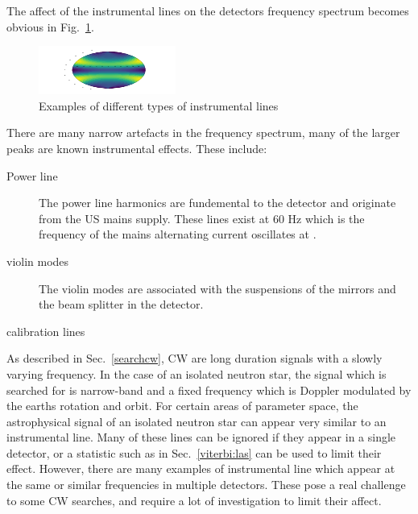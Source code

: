 The affect of the instrumental lines on the detectors frequency spectrum becomes obvious in Fig.~\ref{detchar:line:psd}. 
\begin{figure}
    \centering
    \includegraphics[width=\textwidth]{testimg.png}
    \caption{Examples of different types of instrumental lines}
    \label{detchar:line:psd}
\end{figure}
There are many narrow artefacts in the frequency spectrum, many of the larger peaks are known instrumental effects.
These include:
\begin{description}
	\item[Power line] The power line harmonics are fundemental to the detector and originate from the US mains supply. These lines exist at 60 Hz which is the frequency of the mains alternating current oscillates at \citep{aasi2015CharacterizationLIGO}.
	
	\item[violin modes] The violin modes are associated with the suspensions of the mirrors and the beam splitter in the detector. 
	
	\item[calibration lines]
\end{description}

As described in Sec.~\ref{searchcw}, \ac{CW} are long duration signals with a slowly varying frequency.
In the case of an isolated neutron star, the signal which is searched for is narrow-band and a fixed frequency which is Doppler modulated by the earths rotation and orbit.
For certain areas of parameter space, the astrophysical signal of an isolated neutron star can appear very similar to an instrumental line. 
Many of these lines can be ignored if they appear in a single detector, or a statistic such as in Sec.~\ref{viterbi:las} can be used to limit their effect.
However, there are many examples of instrumental line which appear at the same or similar frequencies in multiple detectors.
These pose a real challenge to some \ac{CW} searches, and require a lot of investigation to limit their affect.



